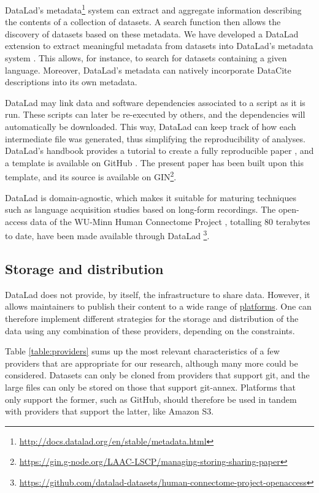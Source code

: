 \documentclass[smallextended]{svjour3}       %
\begin{document}
DataLad's metadata\footnote{\url{http://docs.datalad.org/en/stable/metadata.html}} system can extract and aggregate information describing the contents of a collection of datasets. A search function then allows the discovery of datasets based on these metadata. We have developed a DataLad extension to extract meaningful metadata from datasets into DataLad's metadata system \citep{datalad_extension}. This allows, for instance, to search for datasets containing a given language. Moreover, DataLad's metadata can natively incorporate DataCite \citep{brase2009datacite} descriptions into its own metadata.

DataLad may link data and software dependencies associated to a script as it is run. These scripts can later be re-executed by others, and the dependencies will automatically be downloaded. This way, DataLad can keep track of how each intermediate file was generated, thus simplifying the reproducibility of analyses. DataLad's handbook provides a tutorial to create a fully reproducible paper \citep[Chapter~22]{datalad_handbook}, and a template is available on GitHub \citep{reproducible_paper}. The present paper has been built upon this template, and its source is available on GIN\footnote{\url{https://gin.g-node.org/LAAC-LSCP/managing-storing-sharing-paper}}.

DataLad is domain-agnostic, which makes it suitable for maturing techniques such as language acquisition studies based on long-form recordings. The open-access data of the WU-Minn Human Connectome Project \citep{pub.1022076283}, totalling 80 terabytes to date, have been made available through DataLad \footnote{\label{note:hcp}\url{https://github.com/datalad-datasets/human-connectome-project-openaccess}}.


\subsection{Storage and distribution}\label{section:gin}

DataLad does not provide, by itself, the infrastructure to share data. However, it allows maintainers to publish their content to a wide range of \href{https://git-annex.branchable.com/special_remotes/}{platforms}. One can therefore implement different strategies for the storage and distribution of the data using any combination of these providers, depending on the constraints.

Table \ref{table:providers} sums up the most relevant characteristics of a few providers that are appropriate for our research, although many more could be considered. Datasets can only be cloned from providers that support git, and the large files can only be stored on those that support git-annex. Platforms that only support the former, such as GitHub, should therefore be used in tandem with providers that support the latter, like Amazon S3.
\end{document}

